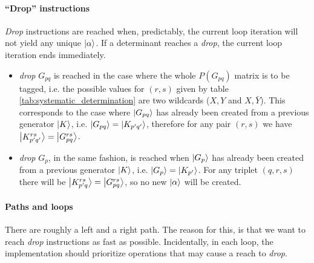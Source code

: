 \documentclass[./thesis.tex]{subfiles}
\begin{document}
\paragraph{``Drop'' instructions}
\emph{Drop} instructions are reached when, predictably, the current loop iteration will not yield any unique ${\ket{\alpha}}$. If a determinant reaches a \emph{drop}, the current loop iteration ends immediately.

\begin{itemize}
\item
\emph{drop} $G_{pq}$ is reached in the case where the whole $P(G_{pq})$ matrix is to be tagged, i.e. the possible values for $(r,s)$ given by table \ref{tab:systematic_determination} are two wildcards ($X,Y$ and $X,\bar Y$).
This corresponds to the case where $\ket {G_{pq}}$ has already been created from a previous generator $\ket K$, i.e. $\ket {G_{pq}} = \ket {K_{p'q'}}$, therefore for any pair $(r,s)$ we have $\ket {K_{p'q'}^{rs}} = \ket {G_{pq}^{rs}}$.\\
\item
\emph{drop} $G_{p}$, in the same fashion, is reached when $\ket {G_{p}}$ has already been created from a previous generator $\ket K$, i.e. $\ket {G_{p}} = \ket{K_{p'}}$. For any triplet $(q,r,s)$ there will be $\ket {K_{p'q}^{rs}} = \ket {G_{pq}^{rs}}$, so no new ${\ket{\alpha}}$ will be created.
\end{itemize}


\paragraph{Paths and loops}
There are roughly a left and a right path. The reason for this, is that we want to reach \emph{drop} instructions as fast as possible. Incidentally, in each loop, the implementation should prioritize operations that may cause a reach to \emph{drop}.

\end{document}
